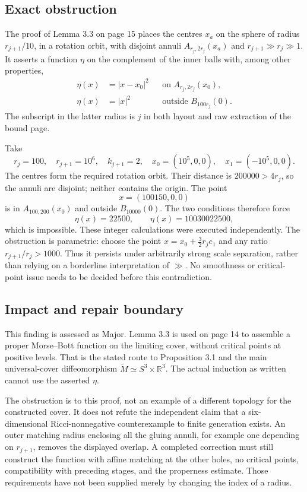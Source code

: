 \documentclass[10pt]{article}
\begin{document}
\subsection*{Exact obstruction}
The proof of Lemma 3.3 on page 15 places the centres \(x_a\) on the sphere of radius \(r_{j+1}/10\), in a rotation orbit, with disjoint annuli \(A_{r_j,2r_j}(x_a)\) and \(r_{j+1}\gg r_j\gg1\). It asserts a function \(\eta\) on the complement of the inner balls with, among other properties, \[\begin{aligned}
\eta(x)&=|x-x_0|^2 &&\text{on }A_{r_j,2r_j}(x_0),\\
\eta(x)&=|x|^2 &&\text{outside }B_{100r_j}(0).\end{aligned}\] The subscript in the latter radius is \(j\) in both layout and raw extraction of the bound page.\par
Take \[r_j=100,\quad r_{j+1}=10^6,\quad k_{j+1}=2,\quad
x_0=(10^5,0,0),\quad x_1=(-10^5,0,0).\] The centres form the required rotation orbit. Their distance is \(200000>4r_j\), so the annuli are disjoint; neither contains the origin. The point \[x=(100150,0,0)\] is in \(A_{100,200}(x_0)\) and outside \(B_{10000}(0)\). The two conditions therefore force \[\eta(x)=22500,\qquad \eta(x)=10030022500,\] which is impossible. These integer calculations were executed independently. The obstruction is parametric: choose the point \(x=x_0+\tfrac32 r_j e_1\) and any ratio \(r_{j+1}/r_j>1000\). Thus it persists under arbitrarily strong scale separation, rather than relying on a borderline interpretation of \(\gg\). No smoothness or critical-point issue needs to be decided before this contradiction.\par
\subsection*{Impact and repair boundary}
This finding is assessed as Major. Lemma 3.3 is used on page 14 to assemble a proper Morse–Bott function on the limiting cover, without critical points at positive levels. That is the stated route to Proposition 3.1 and the main universal-cover diffeomorphism \(\widetilde M\simeq S^3\times\mathbb R^3\). The actual induction as written cannot use the asserted \(\eta\).\par
The obstruction is to this proof, not an example of a different topology for the constructed cover. It does not refute the independent claim that a six-dimensional Ricci-nonnegative counterexample to finite generation exists. An outer matching radius enclosing all the gluing annuli, for example one depending on \(r_{j+1}\), removes the displayed overlap. A completed correction must still construct the function with affine matching at the other holes, no critical points, compatibility with preceding stages, and the properness estimate. Those requirements have not been supplied merely by changing the index of a radius.\par
\end{document}
